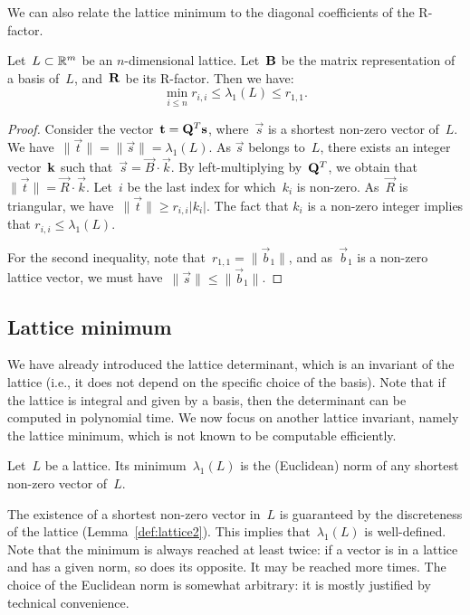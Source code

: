 We can also relate the lattice minimum to the diagonal coefficients of the R-factor. 

\begin{lemma}
\label{le:Rlambda}
Let~$L \subset \mR^m$ be an $n$-dimensional lattice. Let~${\bf B}$ be the matrix representation of a basis of~$L$, and~${\bf R}$ 
be its R-factor. Then we have:
\[ \min_{i \leq n} r_{i,i} \leq \lambda_1(L) \leq r_{1,1}.\]
\end{lemma} 

\begin{proof}
Consider the vector~$\vec{t} = {\bf Q}^T \vec{s}$, where~$\vec{s}$ is a shortest non-zero vector of~$L$. We have~$\|\vec{t}\| = \|\vec{s}\|=\lambda_1(L)$. As  $\vec{s}$ belongs to~$L$, there exists an integer vector~${\bf k}$  such that~$\vec{s} = \vec{B} \cdot  \vec{k}$. By left-multiplying by~${\bf Q}^T$, we obtain that $\|\vec{t}\| = \vec{R} \cdot  \vec{k}$. Let~$i$ be the last index for which~$k_i$ is non-zero. As~$\vec{R}$ is triangular, we have~$\|\vec{t}\| \geq r_{i,i} |k_i|$. The fact that $k_i$ is a non-zero integer implies that $r_{i,i} \leq \lambda_1(L)$.

For the second inequality, note that~$r_{1,1} = \|\vec{b}_1\|$, and as~$\vec{b}_1$ is a non-zero lattice vector, we must have~$\|\vec{s}\|\leq \|\vec{b}_1\|$.
\end{proof}



\subsection{Lattice minimum}

We have already introduced the lattice determinant, which is an invariant of the lattice (i.e., it does not depend on the 
specific choice of the basis). Note that if the lattice is integral and given by a basis, then the determinant can be computed 
in polynomial time. 
We now focus on another lattice invariant, namely the lattice minimum, which is not known to be computable efficiently.  

\begin{definition}
Let~$L$ be a lattice. Its minimum~$\lambda_1(L)$ is the (Euclidean) norm of any shortest non-zero vector of~$L$. 
\end{definition}

The existence of a shortest non-zero vector in~$L$ is guaranteed by the discreteness of the lattice (Lemma~\ref{def:lattice2}). 
This implies that~$\lambda_1(L)$ is well-defined. Note that the minimum is always reached at least twice: if a vector is in a lattice 
and has a given norm, so does its opposite. It may be reached more times. The choice of the Euclidean norm is somewhat arbitrary:
it is mostly justified by technical convenience.  

